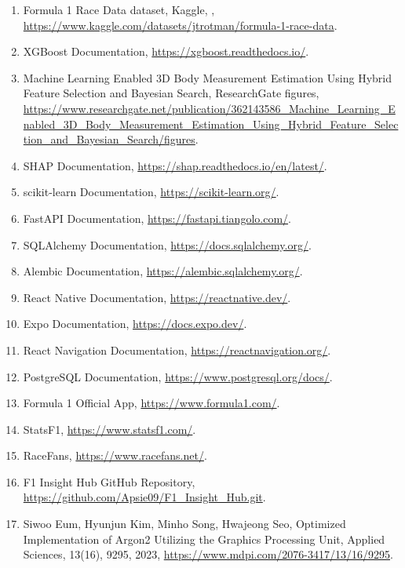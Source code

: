 \documentclass[12pt,a4paper]{article}
\newcommand{\code}[1]{\texttt{\detokenize{#1}}}
\begin{document}
\begin{enumerate}
    \item \label{ref:1}Formula 1 Race Data dataset, Kaggle, \code{jtrotman/formula-1-race-data}, \url{https://www.kaggle.com/datasets/jtrotman/formula-1-race-data}.
    \item \label{ref:2}XGBoost Documentation, \url{https://xgboost.readthedocs.io/}.
    \item \label{ref:3}Machine Learning Enabled 3D Body Measurement Estimation Using Hybrid Feature Selection and Bayesian Search, ResearchGate figures, \url{https://www.researchgate.net/publication/362143586_Machine_Learning_Enabled_3D_Body_Measurement_Estimation_Using_Hybrid_Feature_Selection_and_Bayesian_Search/figures}.
    \item \label{ref:4}SHAP Documentation, \url{https://shap.readthedocs.io/en/latest/}.
    \item \label{ref:5}scikit-learn Documentation, \url{https://scikit-learn.org/}.
    \item \label{ref:6}FastAPI Documentation, \url{https://fastapi.tiangolo.com/}.
    \item \label{ref:7}SQLAlchemy Documentation, \url{https://docs.sqlalchemy.org/}.
    \item \label{ref:8}Alembic Documentation, \url{https://alembic.sqlalchemy.org/}.
    \item \label{ref:9}React Native Documentation, \url{https://reactnative.dev/}.
    \item \label{ref:10}Expo Documentation, \url{https://docs.expo.dev/}.
    \item \label{ref:11}React Navigation Documentation, \url{https://reactnavigation.org/}.
    \item \label{ref:12}PostgreSQL Documentation, \url{https://www.postgresql.org/docs/}.
    \item \label{ref:13}Formula 1 Official App, \url{https://www.formula1.com/}.
    \item \label{ref:14}StatsF1, \url{https://www.statsf1.com/}.
    \item \label{ref:15}RaceFans, \url{https://www.racefans.net/}.
    \item \label{ref:16}F1 Insight Hub GitHub Repository, \url{https://github.com/Apsie09/F1_Insight_Hub.git}.
    \item \label{ref:17}Siwoo Eum, Hyunjun Kim, Minho Song, Hwajeong Seo, Optimized Implementation of Argon2 Utilizing the Graphics Processing Unit, Applied Sciences, 13(16), 9295, 2023, \url{https://www.mdpi.com/2076-3417/13/16/9295}.
\end{enumerate}
\end{document}
